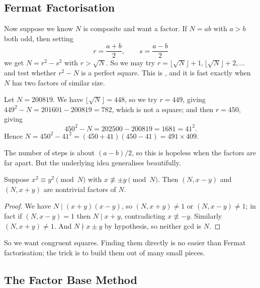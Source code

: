 \subsection{Fermat Factorisation}

Now suppose we know $N$ is composite and want a factor. If $N = ab$ with $a > b$ both odd, then setting
$$
r = \frac{a+b}2, \qquad s = \frac{a - b}2
$$
we get $N = r^2 - s^2$ with $r > \sqrt N$. So we may try $r = \lfloor\sqrt N\rfloor + 1, \lfloor\sqrt N\rfloor+2, \dots$ and test whether $r^2 - N$ is a perfect square. This is , and it is fast exactly when $N$ has two factors of similar size.

\begin{example}
	Let $N = 200819$. We have $\lfloor\sqrt N\rfloor = 448$, so we try $r = 449$, giving $449^2 - N = 201601 - 200819 = 782$, which is not a square; and then $r = 450$, giving
	$$
	450^2 - N = 202500 - 200819 = 1681 = 41^2.
	$$
	Hence $N = 450^2 - 41^2 = (450+41)(450-41) = 491\times409$.
\end{example}

The number of steps is about $(a - b)/2$, so this is hopeless when the factors are far apart. But the underlying idea generalises beautifully.

\begin{proposition}\label{prop:congsquares}
	Suppose $x^2 \equiv y^2 \pmod N$ with $x \not\equiv \pm y \pmod N$. Then $(N, x-y)$ and $(N, x+y)$ are nontrivial factors of $N$.
\end{proposition}
\begin{proof}
	We have $N \mid (x+y)(x-y)$, so $(N, x+y) \neq 1$ or $(N, x - y) \neq 1$; in fact if $(N, x-y) = 1$ then $N \mid x+y$, contradicting $x \not\equiv -y$. Similarly $(N, x+y) \neq 1$. And $N \nmid x \pm y$ by hypothesis, so neither gcd is $N$.
\end{proof}

So we want congruent squares. Finding them directly is no easier than Fermat factorisation; the trick is to build them out of many small pieces.

\subsection{The Factor Base Method}

